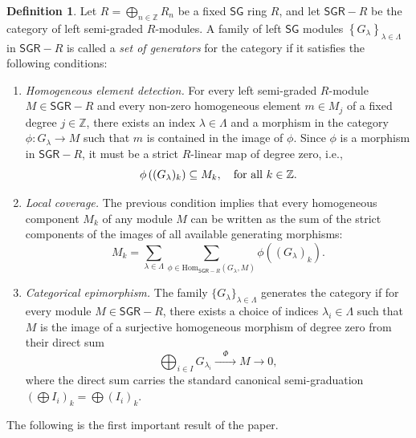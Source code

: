 \documentclass[reqno]{amsart}
\theoremstyle{definition}
\newtheorem{definition}[theorem]{Definition}
\theoremstyle{remark}
\numberwithin{equation}{section}
\begin{document}
\begin{definition}\label{def.SGRgenerators}
Let $R = \bigoplus_{n \in \mathbb{Z}} R_n$ be a fixed $\mathsf{SG}$ ring $R$, and let $\mathsf{SGR}-R$ be the category of left semi-graded $R$-modules. A family of left $\mathsf{SG}$ modules $\left\{G_\lambda\right\}_{\lambda \in \Lambda}$ in $\mathsf{SGR}-R$ is called a {\em set of generators} for the category if it satisfies the following conditions:
\begin{enumerate}
    \item [\rm (i)] {\em Homogeneous element detection.} For every left semi-graded $R$-module $M \in \mathsf{SGR}-R$ and every non-zero homogeneous element $m \in M_j$ of a fixed degree $j \in \mathbb{Z}$, there exists an index $\lambda \in \Lambda$ and a morphism in the category $\phi: G_\lambda \longrightarrow M$ such that $m$ is contained in the image of $\phi$. Since $\phi$ is a morphism in $\mathsf{SGR}-R$, it must be a strict $R$-linear map of degree zero, i.e., 
    \[
    \phi\left((G_\lambda)_k\right) \subseteq M_k, \quad {\rm for \ all } \ k \in \mathbb{Z}.
    \]

    \item [\rm (ii)] {\em Local coverage.} The previous condition implies that every homogeneous component $M_k$ of any module $M$ can be written as the sum of the strict components of the images of all available generating morphisms:
    \[
    M_k = \sum_{\lambda \in \Lambda} \sum_{\phi \in \text{Hom}_{\mathsf{SGR}-R}(G_\lambda, M)} \phi\left((G_\lambda)_k\right).
    \]

    \item [\rm (iii)] {\em Categorical epimorphism.} The family $\{G_\lambda\}_{\lambda \in \Lambda}$ generates the category if for every module $M \in \mathsf{SGR}-R$, there exists a choice of indices $\lambda_i \in \Lambda$ such that $M$ is the image of a surjective homogeneous morphism of degree zero from their direct sum 
    \[
    \bigoplus_{i \in I} G_{\lambda_i} \xrightarrow{\quad \Phi \quad} M \longrightarrow 0,
    \]
    where the direct sum carries the standard canonical semi-graduation \linebreak $\left(\bigoplus I_i\right)_k = \bigoplus (I_i)_k$.
\end{enumerate}
\end{definition}

The following is the first important result of the paper.
\end{document}
